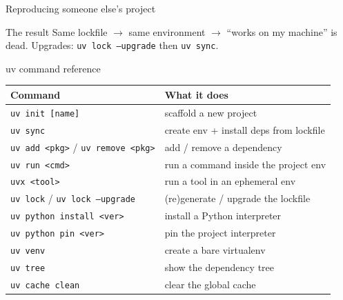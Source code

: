\documentclass[aspectratio=169]{beamer}
\begin{document}
\begin{frame}{Reproducing someone else's project}
  \begin{center}
  \end{center}
  \vspace{0.3cm}
  \begin{block}{The result}
    Same lockfile $\rightarrow$ same environment $\rightarrow$
    ``works on my machine'' is dead. \quad
    Upgrades: \texttt{uv lock --upgrade} then \texttt{uv sync}.
  \end{block}
\end{frame}

\begin{frame}{uv command reference}
  \begin{table}
    \scriptsize
    \begin{tabular}{@{}ll@{}}
      \toprule
      Command & What it does \\
      \midrule
      \texttt{uv init [name]} & scaffold a new project \\
      \texttt{uv sync} & create env + install deps from lockfile \\
      \texttt{uv add <pkg>} / \texttt{uv remove <pkg>} & add / remove a dependency \\
      \texttt{uv run <cmd>} & run a command inside the project env \\
      \texttt{uvx <tool>} & run a tool in an ephemeral env \\
      \texttt{uv lock} / \texttt{uv lock --upgrade} & (re)generate / upgrade the lockfile \\
      \texttt{uv python install <ver>} & install a Python interpreter \\
      \texttt{uv python pin <ver>} & pin the project interpreter \\
      \texttt{uv venv} & create a bare virtualenv \\
      \texttt{uv tree} & show the dependency tree \\
      \texttt{uv cache clean} & clear the global cache \\
      \bottomrule
    \end{tabular}
  \end{table}
\end{frame}
\end{document}
